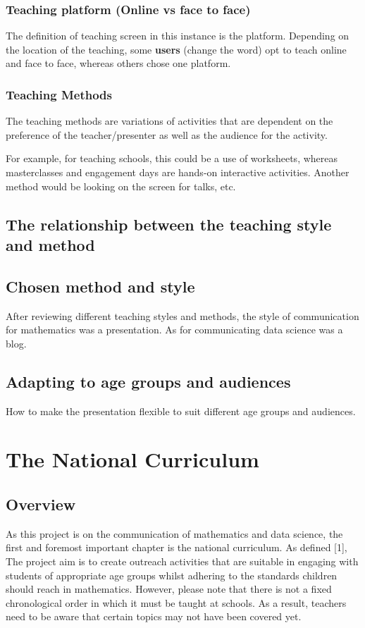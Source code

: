 \documentclass[12pt, a4paper,oneside]{book}
\numberwithin{equation}{section}
\begin{document}
\subsection{Teaching platform (Online vs face to face)}

The definition of teaching screen in this instance is the platform. Depending on the location of the teaching, some \textbf{users} (change the word) opt to teach online and face to face, whereas others chose one platform.

\subsection{Teaching Methods}

The teaching methods are variations of activities that are dependent on the preference of the teacher/presenter as well as the audience for the activity.

For example, for teaching schools, this could be a use of worksheets, whereas masterclasses and engagement days are hands-on interactive activities. Another method would be looking on the screen for talks, etc.

\section{The relationship between the teaching style and method}

\section{Chosen method and style}

After reviewing different teaching styles and methods, the style of communication for mathematics was a presentation. As for communicating data science was a blog.

\section{Adapting to age groups and audiences}

How to make the presentation flexible to suit different age groups and audiences.

\chapter{The National Curriculum}
\section{Overview}
As this project is on the communication of mathematics and data science, the first and foremost important chapter is the national curriculum. As defined [1], The project aim is to create outreach activities that are suitable in engaging with students of appropriate age groups whilst adhering to the standards children should reach in mathematics. However, please note that there is not a fixed chronological order in which it must be taught at schools. As a result, teachers need to be aware that certain topics may not have been covered yet.
\end{document}
